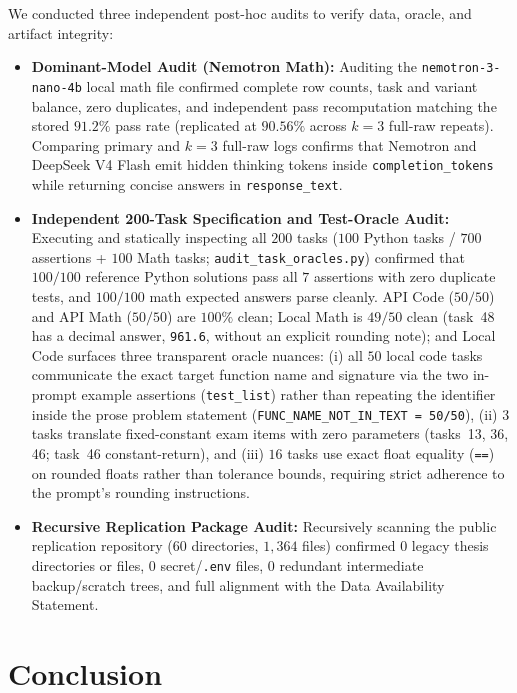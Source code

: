 \documentclass[a4paper,fleqn]{cas-sc}
\providecommand{\tightlist}{%
  \setlength{\itemsep}{0pt}\setlength{\parskip}{0pt}}
\begin{document}
We conducted three independent post-hoc audits to verify data, oracle, and artifact integrity:
\begin{itemize}
\tightlist
\item \textbf{Dominant-Model Audit (Nemotron Math):} Auditing the \texttt{nemotron-3-nano-4b} local math file confirmed complete row counts, task and variant balance, zero duplicates, and independent pass recomputation matching the stored $91.2\%$ pass rate (replicated at $90.56\%$ across $k = 3$ full-raw repeats). Comparing primary and $k = 3$ full-raw logs confirms that Nemotron and DeepSeek V4 Flash emit hidden thinking tokens inside \texttt{completion\_tokens} while returning concise answers in \texttt{response\_text}.
\item \textbf{Independent 200-Task Specification and Test-Oracle Audit:} Executing and statically inspecting all $200$ tasks ($100$ Python tasks / $700$ assertions + $100$ Math tasks; \texttt{audit\_task\_oracles.py}) confirmed that $100/100$ reference Python solutions pass all $7$ assertions with zero duplicate tests, and $100/100$ math expected answers parse cleanly. API Code ($50/50$) and API Math ($50/50$) are $100\%$ clean; Local Math is $49/50$ clean (task~48 has a decimal answer, \texttt{961.6}, without an explicit rounding note); and Local Code surfaces three transparent oracle nuances: (i) all $50$ local code tasks communicate the exact target function name and signature via the two in-prompt example assertions (\texttt{test\_list}) rather than repeating the identifier inside the prose problem statement (\texttt{FUNC\_NAME\_NOT\_IN\_TEXT = 50/50}), (ii) $3$ tasks translate fixed-constant exam items with zero parameters (tasks~13, 36, 46; task~46 constant-return), and (iii) $16$ tasks use exact float equality (\texttt{==}) on rounded floats rather than tolerance bounds, requiring strict adherence to the prompt's rounding instructions.
\item \textbf{Recursive Replication Package Audit:} Recursively scanning the public replication repository ($60$ directories, $1{,}364$ files) confirmed $0$ legacy thesis directories or files, $0$ secret/\texttt{.env} files, $0$ redundant intermediate backup/scratch trees, and full alignment with the Data Availability Statement.
\end{itemize}

\section{Conclusion}\label{conclusion}
\end{document}
